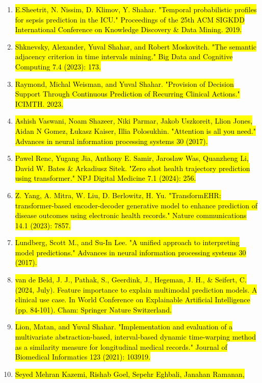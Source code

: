 \documentclass[
]{article}
\begin{document}
\begin{enumerate}
{  multivariate time series via temporal abstraction and time intervals
  mining." Knowledge and Information Systems 45 (2015): 35-74.‏}
\item
  \hl{E.Sheetrit, N. Nissim, D. Klimov, Y. Shahar‏. "Temporal
  probabilistic profiles for sepsis prediction in the ICU." Proceedings
  of the 25th ACM SIGKDD International Conference on Knowledge Discovery
  \& Data Mining. 2019.‏}
\item
  \hl{Shknevsky, Alexander, Yuval Shahar, and Robert Moskovitch. "The
  semantic adjacency criterion in time intervals mining." Big Data and
  Cognitive Computing 7.4 (2023): 173.‏}
\item
  \hl{Raymond, Michal Weisman, and Yuval Shahar. "Provision of Decision
  Support Through Continuous Prediction of Recurring Clinical Actions."
  ICIMTH. 2023.‏}
\item
  \hl{Ashish Vaswani, Noam Shazeer, Niki Parmar, Jakob Uszkoreit, Llion
  Jones, Aidan N Gomez, Łukasz Kaiser, Illia Polosukhin. "Attention is
  all you need." Advances in neural information processing systems 30
  (2017).‏‏}
\item
  \hl{Pawel Renc, Yugang Jia, Anthony E. Samir, Jaroslaw Was, Quanzheng
  Li, David W. Bates \& Arkadiusz Sitek. "Zero shot health trajectory
  prediction using transformer." NPJ Digital Medicine 7.1 (2024): 256.‏}
\item
  \hl{Z. Yang, A. Mitra, W. Liu, D. Berlowitz, H. Yu‏. "TransformEHR:
  transformer-based encoder-decoder generative model to enhance
  prediction of disease outcomes using electronic health records."
  Nature communications 14.1 (2023): 7857.‏}
\item
  \hl{Lundberg, Scott M., and Su-In Lee. "A unified approach to
  interpreting model predictions." Advances in neural information
  processing systems 30 (2017).‏}
\item
  \hl{van de Beld, J. J., Pathak, S., Geerdink, J., Hegeman, J. H., \&
  Seifert, C. (2024, July). Feature importance to explain multimodal
  prediction models. A clinical use case. In World Conference on
  Explainable Artificial Intelligence (pp. 84-101). Cham: Springer
  Nature Switzerland.‏}
\item
  \hl{Lion, Matan, and Yuval Shahar. "Implementation and evaluation of a
  multivariate abstraction-based, interval-based dynamic time-warping
  method as a similarity measure for longitudinal medical records."
  Journal of Biomedical Informatics 123 (2021): 103919.‏}
\item
  \hl{Seyed Mehran Kazemi, Rishab Goel, Sepehr Eghbali, Janahan Ramanan,
}
\end{enumerate}
\end{document}
